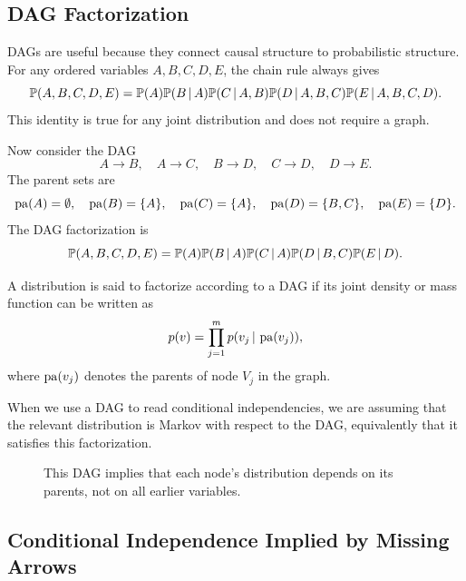 \label{lec:2-4}

\subsection{DAG Factorization}

DAGs are useful because they connect causal structure to probabilistic structure. For any ordered variables $A,B,C,D,E$, the chain rule always gives
\[
\mathbb{P}(A,B,C,D,E)
=
\mathbb{P}(A)\mathbb{P}(B\,\vert\, A)\mathbb{P}(C\,\vert\, A,B)\mathbb{P}(D\,\vert\, A,B,C)\mathbb{P}(E\,\vert\, A,B,C,D).
\]
This identity is true for any joint distribution and does not require a graph.

Now consider the DAG
\[
A\to B,\quad A\to C,\quad B\to D,\quad C\to D,\quad D\to E.
\]
The parent sets are
\[
\operatorname{pa}(A)=\emptyset,\quad
\operatorname{pa}(B)=\{A\},\quad
\operatorname{pa}(C)=\{A\},\quad
\operatorname{pa}(D)=\{B,C\},\quad
\operatorname{pa}(E)=\{D\}.
\]
The DAG factorization is
\[
\mathbb{P}(A,B,C,D,E)
=
\mathbb{P}(A)\mathbb{P}(B\,\vert\, A)\mathbb{P}(C\,\vert\, A)\mathbb{P}(D\,\vert\, B,C)\mathbb{P}(E\,\vert\, D).
\]

\begin{definition}
A distribution is said to factorize according to a DAG if its joint density or mass function can be written as
\[
p(v)=\prod_{j=1}^m p(v_j\,\vert\, \operatorname{pa}(v_j)),
\]
where $\operatorname{pa}(v_j)$ denotes the parents of node $V_j$ in the graph.
\end{definition}

When we use a DAG to read conditional independencies, we are assuming that the
relevant distribution is Markov with respect to the DAG, equivalently that it
satisfies this factorization.

\begin{figure}[H]
\centering
{}
\caption{This DAG implies that each node's distribution depends on its parents, not on all earlier variables.}
\end{figure}

\subsection{Conditional Independence Implied by Missing Arrows}

